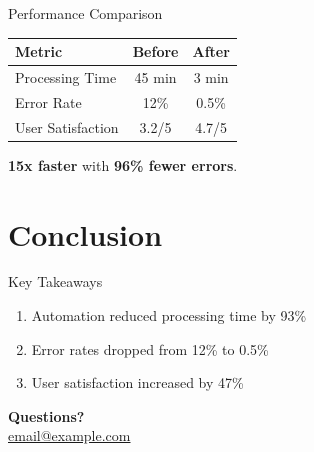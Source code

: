 \documentclass[aspectratio=169]{beamer}
\begin{document}
\begin{frame}{Performance Comparison}
\begin{table}
\centering
\begin{tabular}{lcc}
\toprule
\textbf{Metric} & \textbf{Before} & \textbf{After} \\
\midrule
Processing Time & 45 min & 3 min \\
Error Rate & 12\% & 0.5\% \\
User Satisfaction & 3.2/5 & 4.7/5 \\
\bottomrule
\end{tabular}
\end{table}

\vspace{12pt}
\textbf{15x faster} with \textbf{96\% fewer errors}.
\end{frame}

\section{Conclusion}

\begin{frame}{Key Takeaways}
\begin{enumerate}
  \item Automation reduced processing time by 93\%
  \item Error rates dropped from 12\% to 0.5\%
  \item User satisfaction increased by 47\%
\end{enumerate}

\vspace{20pt}
\centering
\Large\textbf{Questions?}\\[8pt]
\normalsize\href{mailto:email@example.com}{email@example.com}
\end{frame}
\end{document}
